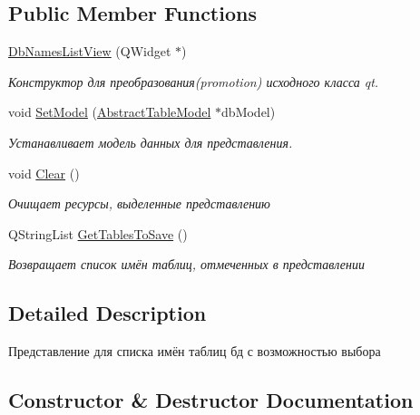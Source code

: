 \subsection*{Public Member Functions}
\begin{DoxyCompactItemize}
\item 
\mbox{\hyperlink{class_db_names_list_view_acd95e819ffa36f121ade61a0a776521d}{Db\+Names\+List\+View}} (Q\+Widget $\ast$)
\begin{DoxyCompactList}\small\item\em Конструктор для преобразования(promotion) исходного класса qt. \end{DoxyCompactList}\item 
void \mbox{\hyperlink{class_db_names_list_view_aff7383c33a95d67698b545c88e453c5d}{Set\+Model}} (\mbox{\hyperlink{class_abstract_table_model}{Abstract\+Table\+Model}} $\ast$db\+Model)
\begin{DoxyCompactList}\small\item\em Устанавливает модель данных для представления. \end{DoxyCompactList}\item 
\mbox{\label{class_db_names_list_view_a47edbf1349f633347f016d7496a55dab}} 
void \mbox{\hyperlink{class_db_names_list_view_a47edbf1349f633347f016d7496a55dab}{Clear}} ()
\begin{DoxyCompactList}\small\item\em Очищает ресурсы, выделенные представлению \end{DoxyCompactList}\item 
\mbox{\label{class_db_names_list_view_a00d3e4b0099bb79436824ef3ef840048}} 
Q\+String\+List \mbox{\hyperlink{class_db_names_list_view_a00d3e4b0099bb79436824ef3ef840048}{Get\+Tables\+To\+Save}} ()
\begin{DoxyCompactList}\small\item\em Возвращает список имён таблиц, отмеченных в представлении \end{DoxyCompactList}\end{DoxyCompactItemize}


\subsection{Detailed Description}
Представление для списка имён таблиц бд с возможностью выбора 

\subsection{Constructor \& Destructor Documentation}
\mbox{\label{class_db_names_list_view_acd95e819ffa36f121ade61a0a776521d}} 
